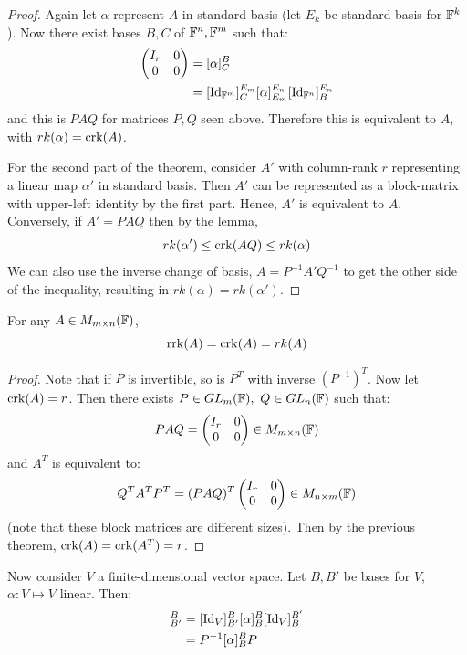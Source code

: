 \documentclass[../Main.tex]{subfiles}
\begin{document}
\begin{proof}
    Again let $\alpha$ represent $A$ in standard basis (let $E_k$ be standard basis for $\mathbb{F}^k$). Now there exist bases $B, C$ of $\mathbb{F}^n, \mathbb{F}^m$ such that:
    \begin{align*}
        \begin{pmatrix}
            I_r & 0 \\
            0 & 0
        \end{pmatrix}
        &= [\alpha]_C^B \\
        &= [\operatorname{Id}_{\mathbb{F}^m}]_C^{E_m} [\alpha]_{E_m}^{E_n} [\operatorname{Id}_{\mathbb{F}^n}]^{E_n}_B
    \end{align*}
    and this is $PAQ$ for matrices $P, Q$ seen above. Therefore this is equivalent to $A$, with $rk(\alpha) = \operatorname{crk}(A)$.

    For the second part of the theorem, consider $A'$ with column-rank $r$ representing a linear map $\alpha'$ in standard basis. Then $A'$ can be represented as a block-matrix with upper-left identity by the first part. Hence, $A'$ is equivalent to $A$. Conversely, if $A' = PAQ$ then by the lemma,
    \begin{equation*}
        rk(\alpha') \leq \operatorname{crk}(AQ) \leq rk(\alpha)
    \end{equation*}
    We can also use the inverse change of basis, $A = P^{-1} A' Q^{-1}$ to get the other side of the inequality, resulting in $rk(\alpha) = rk(\alpha')$.
\end{proof}
\begin{theorem}
    For any $A \in M_{m \times n}(\mathbb{F})$,
    \begin{equation*}
        \operatorname{rrk}(A) = \operatorname{crk}(A) = rk(A)
    \end{equation*}
    \label{thmMatrixRank}
\end{theorem}
\begin{proof}
    Note that if $P$ is invertible, so is $P^T$ with inverse $(P^{-1})^T$. Now let $\operatorname{crk}(A) = r$. Then there exists $P \in GL_m(\mathbb{F}),~Q \in GL_n(\mathbb{F})$ such that:
    \begin{equation*}
        PAQ =
        \begin{pmatrix}
            I_r & 0 \\
            0 & 0
        \end{pmatrix}
        \in M_{m \times n}(\mathbb{F})
    \end{equation*}
    and $A^T$ is equivalent to:
    \begin{equation*}
        Q^TA^TP^T = (PAQ)^T
        \begin{pmatrix}
            I_r & 0 \\
            0 & 0
        \end{pmatrix}
        \in M_{n \times m}(\mathbb{F})
    \end{equation*}
    (note that these block matrices are different sizes).
    Then by the previous theorem, $\operatorname{crk}(A) = \operatorname{crk}(A^T) = r$.
\end{proof}
Now consider $V$ a finite-dimensional vector space. Let $B, B'$ be bases for $V$, $\alpha : V \mapsto V$ linear. Then:
\begin{align*}
    [\alpha]_{B'}^B &= [\Id_V]_{B'}^B [\alpha]_B^B [\Id_V]_B^{B'} \\
    &= P^{-1} [\alpha]_B^B P
\end{align*}
\end{document}
